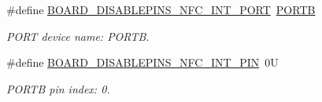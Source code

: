 \begin{DoxyCompactItemize}
\mbox{\label{group__pin__mux_gae9b8626d8c93348ed73e055863d11a97}} 
\#define \mbox{\hyperlink{group__pin__mux_gae9b8626d8c93348ed73e055863d11a97}{B\+O\+A\+R\+D\+\_\+\+D\+I\+S\+A\+B\+L\+E\+P\+I\+N\+S\+\_\+\+N\+F\+C\+\_\+\+I\+N\+T\+\_\+\+P\+O\+RT}}~\mbox{\hyperlink{group___p_o_r_t___peripheral___access___layer_ga09a0c85cd3da09d9cdf63a5ac4c39f77}{P\+O\+R\+TB}}
\begin{DoxyCompactList}\small\item\em P\+O\+RT device name\+: P\+O\+R\+TB. \end{DoxyCompactList}\item 
\mbox{\label{group__pin__mux_gaf060597d1a2e17fa44a4cb7fda9a4015}} 
\#define \mbox{\hyperlink{group__pin__mux_gaf060597d1a2e17fa44a4cb7fda9a4015}{B\+O\+A\+R\+D\+\_\+\+D\+I\+S\+A\+B\+L\+E\+P\+I\+N\+S\+\_\+\+N\+F\+C\+\_\+\+I\+N\+T\+\_\+\+P\+IN}}~0U
\begin{DoxyCompactList}\small\item\em P\+O\+R\+TB pin index\+: 0. \end{DoxyCompactList}\end{DoxyCompactItemize}

